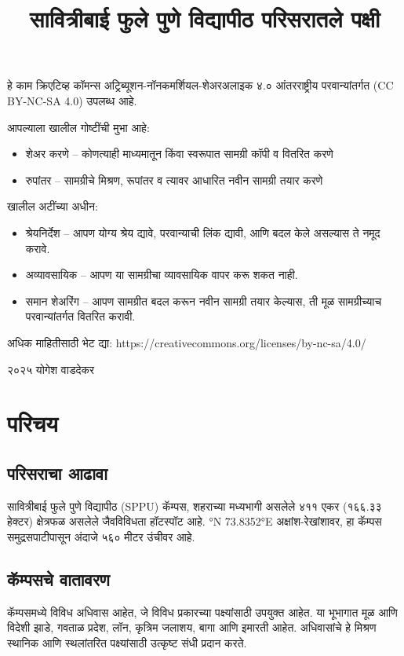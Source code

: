 \documentclass[a4paper,12pt,landscape]{memoir}
\title{सावित्रीबाई फुले पुणे विद्यापीठ परिसरातले पक्षी}
\author{}
\date{}
\newcommand{\introsection}[2]{%
  \begin{minipage}[t]{0.48\textwidth}
    \begin{mdframed}[
      linecolor=headingcolor,
      linewidth=1pt,
      roundcorner=5pt,
      leftmargin=0pt,
      rightmargin=0pt,
      backgroundcolor=headingcolor!5
    ]
      #1
    \end{mdframed}
  \end{minipage}\hfill
  \begin{minipage}[t]{0.48\textwidth}
    \begin{mdframed}[
      linecolor=headingcolor,
      linewidth=1pt,
      roundcorner=5pt,
      leftmargin=0pt,
      rightmargin=0pt,
      backgroundcolor=headingcolor!5
    ]
      #2
    \end{mdframed}
  \end{minipage}
  \newpage
}
\begin{document}
\maketitle

\begin{center}
\vspace{1cm}
{\large हे काम क्रिएटिव्ह कॉमन्स अट्रिब्यूशन-नॉनकमर्शियल-शेअरअलाइक ४.० आंतरराष्ट्रीय परवान्यांतर्गत ({\latintext CC BY-NC-SA 4.0}) उपलब्ध आहे.}

\vspace{0.5cm}
{\normalsize आपल्याला खालील गोष्टींची मुभा आहे:
\begin{itemize}
\item शेअर करणे -- कोणत्याही माध्यमातून किंवा स्वरूपात सामग्री कॉपी व वितरित करणे
\item रुपांतर -- सामग्रीचे मिश्रण, रूपांतर व त्यावर आधारित नवीन सामग्री तयार करणे
\end{itemize}

खालील अटींच्या अधीन:
\begin{itemize}
\item श्रेयनिर्देश -- आपण योग्य श्रेय द्यावे, परवान्याची लिंक द्यावी, आणि बदल केले असल्यास ते नमूद करावे.
\item अव्यावसायिक -- आपण या सामग्रीचा व्यावसायिक वापर करू शकत नाही.
\item समान शेअरिंग -- आपण सामग्रीत बदल करून नवीन सामग्री तयार केल्यास, ती मूळ सामग्रीच्याच परवान्यांतर्गत वितरित करावी.
\end{itemize}
}

\vspace{0.5cm}
{\small अधिक माहितीसाठी भेट द्या: {\latinmono https://creativecommons.org/licenses/by-nc-sa/4.0/}}

\vspace{1cm}

{\large{\latintext \textcopyright} २०२५ योगेश वाडदेकर}
\end{center}


\chapter*{परिचय}

\introsection{%
  \section*{परिसराचा आढावा}
  सावित्रीबाई फुले पुणे विद्यापीठ ({\latintext SPPU}) कॅम्पस, शहराच्या मध्यभागी असलेले ४११ एकर (१६६.३३ हेक्टर) क्षेत्रफळ असलेले 
  जैवविविधता हॉटस्पॉट आहे. {\latintext 18.5529°N 73.8352°E} अक्षांश-रेखांशावर, हा कॅम्पस समुद्रसपाटीपासून अंदाजे ५६० मीटर उंचीवर आहे.
}{%
  \section*{कॅम्पसचे वातावरण}
  कॅम्पसमध्ये विविध अधिवास आहेत, जे विविध प्रकारच्या पक्ष्यांसाठी उपयुक्त आहेत. या भूभागात मूळ आणि विदेशी झाडे, गवताळ प्रदेश, लॉन, कृत्रिम जलाशय,
   बागा आणि इमारती आहेत. अधिवासांचे हे मिश्रण स्थानिक आणि स्थलांतरित पक्ष्यांसाठी उत्कृष्ट संधी प्रदान करते.
}
\end{document}
